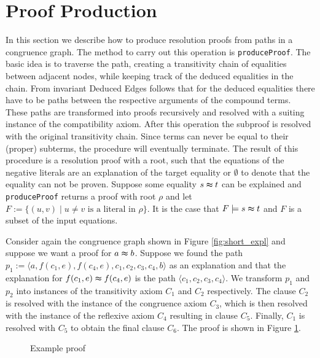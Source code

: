 \section{Proof Production}
\label{sec:proofproduction}

In this section we describe how to produce resolution proofs from paths in a congruence graph.
The method to carry out this operation is \texttt{produceProof}.
The basic idea is to traverse the path, creating a transitivity chain of equalities between adjacent nodes, while keeping track of the deduced equalities in the chain.
From invariant Deduced Edges follows that for the deduced equalities there have to be paths between the respective arguments of the compound terms.
These paths are transformed into proofs recursively and resolved with a suiting instance of the compatibility axiom.
After this operation the subproof is resolved with the original transitivity chain.
Since terms can never be equal to their (proper) subterms, the procedure will eventually terminate.
The result of this procedure is a resolution proof with a root, such that the equations of the negative literals are an explanation of the target equality or $\emptyset$ to denote that the equality can not be proven.
Suppose some equality $s \thickapprox t$ can be explained and \texttt{produceProof} returns a proof with root $\rho$ and
let $F := \{(u,v) \mid u \neq v \text{ is a literal in } \rho\}$.
It is the case that $F \models s \thickapprox t$ and $F$ is a subset of the input equations.




\begin{example}

Consider again the congruence graph shown in Figure \ref{fig:short_expl} and suppose we want a proof for $a \thickapprox b$.
Suppose we found the path $p_1 := \langle  a, f(c_1,e), f(c_4,e), c_1, c_2, c_3, c_4, b \rangle$ as an explanation and that the explanation for $f(c_1,e) \thickapprox f(c_4,e)$ is the path $\langle c_1, c_2, c_3, c_4 \rangle$.
We transform $p_1$ and $p_2$ into instances of the transitivity axiom $C_1$ and $C_2$ respectively. 
The clause $C_2$ is resolved with the instance of the congruence axiom $C_3$, which is then resolved with the instance of the reflexive axiom $C_4$ resulting in clause $C_5$.
Finally, $C_1$ is resolved with $C_5$ to obtain the final clause $C_6$.
The proof is shown in Figure \ref{fig:proofprod}.

\begin{figure}[!h]

\caption{Example proof}
\label{fig:proofprod}
\end{figure}

\end{example}

